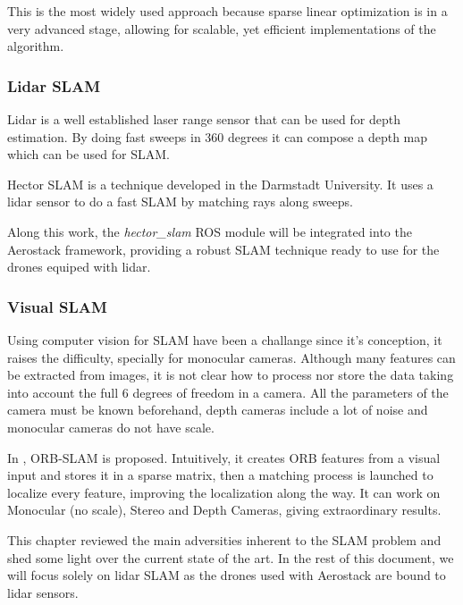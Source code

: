       This is the most widely used approach because sparse linear optimization is in a very advanced stage, allowing for scalable, yet efficient implementations of the algorithm.

    \subsubsection{Lidar SLAM}

      Lidar is a well established laser range sensor that can be used for depth estimation. By doing fast sweeps in 360 degrees it can compose a depth map which can be used for SLAM.

      Hector SLAM \cite{hector_slam} is a technique developed in the Darmstadt University. It uses a lidar sensor to do a fast SLAM by matching rays along sweeps.

      Along this work, the \textit{hector\_slam} ROS module will be integrated into the Aerostack framework, providing a robust SLAM technique ready to use for the drones equiped with lidar.

    \subsubsection{Visual SLAM}

      Using computer vision for SLAM have been a challange since it's conception, it raises the difficulty, specially for monocular cameras. Although many features can be extracted from images, it is not clear how to process nor store the data taking into account the full 6 degrees of freedom in a camera. All the parameters of the camera must be known beforehand, depth cameras include a lot of noise and monocular cameras do not have scale.

      In \cite{murTRO2015}, ORB-SLAM is proposed. Intuitively, it creates ORB features from a visual input and stores it in a sparse matrix, then a matching process is launched to localize every feature, improving the localization along the way. It can work on Monocular (no scale), Stereo and Depth Cameras, giving extraordinary results.

  This chapter reviewed the main adversities inherent to the SLAM problem and shed some light over the current state of the art. In the rest of this document, we will focus solely on lidar SLAM as the drones used with Aerostack are bound to lidar sensors. 


